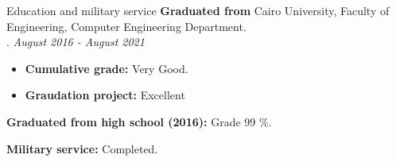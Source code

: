 \documentclass{resume}
\begin{document}

\begin{rSection}{Education and military service}
  \textbf{Graduated from} Cairo University, Faculty of Engineering, Computer Engineering Department.\\ . \hfill {\em August 2016 - August 2021}

  \begin{itemize}
      \item \textbf{Cumulative grade:} Very Good. 
      \item \textbf{Graudation project:} Excellent\\
  \end{itemize}

  \textbf{Graduated from high school (2016):} Grade 99 \%.

  \textbf{Military service:} Completed.

\end{rSection}

\end{document}
